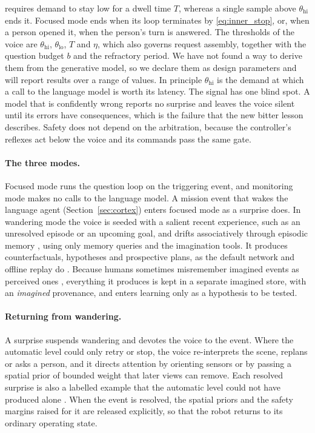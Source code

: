 requires demand to stay low for a dwell time $T$, whereas a single sample above $\theta_{\text{hi}}$ ends it. Focused
mode ends when its loop terminates by \eqref{eq:inner_stop}, or, when a person opened it, when the person's turn is
answered. The thresholds of the voice are $\theta_{\text{hi}}$, $\theta_{\text{lo}}$, $T$ and $\eta$, which also
governs request assembly, together with the question budget $b$ and the refractory period. We have not found a way to
derive them from the generative model, so we declare them as design parameters and will report results over a range
of values. In principle $\theta_{\text{hi}}$ is the demand at which a call to the language model is worth
its latency. The signal has one blind spot. A model that is confidently wrong reports no surprise and leaves the voice
silent until its errors have consequences, which is the failure that the new bitter lesson describes. Safety does not
depend on the arbitration, because the controller's reflexes act below the voice and its commands pass the same gate.

\paragraph{The three modes.}
Focused mode runs the question loop on the triggering event, and monitoring mode makes no calls to the language
model. A mission event that wakes the language agent (Section~\ref{sec:cortex}) enters focused mode as a surprise does. In wandering mode the voice is seeded with a salient recent experience, such as an unresolved episode or an
upcoming goal, and drifts associatively through episodic memory \cite{christoff2016mind}, using only memory queries
and the imagination tools. It produces counterfactuals, hypotheses and prospective plans, as the default network
and offline replay do \cite{buckner2008brain, mattar2018prioritized}. Because humans sometimes misremember imagined
events as perceived ones \cite{johnson1993source}, everything it produces is kept in a separate imagined store, with
an \emph{imagined} provenance, and enters learning only as a hypothesis to be tested.

\paragraph{Returning from wandering.}
A surprise suspends wandering and devotes the voice to the event. Where the automatic level could only retry or
stop, the voice re-interprets the scene, replans or asks a person, and it directs attention by orienting sensors or
by passing a spatial prior of bounded weight that later views can remove. Each resolved surprise is also a labelled
example that the automatic level could not have produced alone \cite{fitts1967human}. When the event is resolved,
the spatial priors and the safety margins raised for it are released explicitly, so that the robot returns to its
ordinary operating state.

